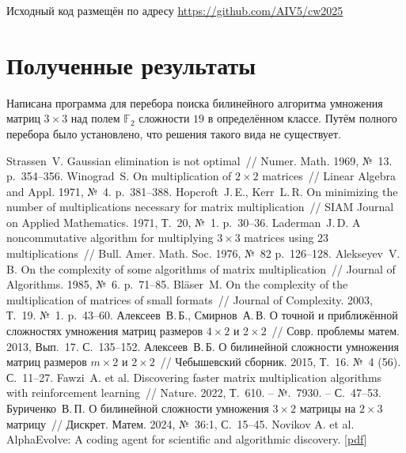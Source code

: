 \documentclass[12pt]{article}
\begin{document}
Исходный код размещён по адресу \url{https://github.com/AIV5/cw2025}

\section{Полученные результаты}

Написана программа для перебора поиска билинейного алгоритма умножения матриц $3 \times 3$ над полем $\mathbb F_2$ сложности $19$ в определённом классе. Путём полного перебора было установлено, что решения такого вида не существует.

%
\begin{thebibliography}{99}

   Strassen~V. Gaussian elimination is not optimal~// Numer. Math. 1969, №~13. p.~354--356.
   Winograd~S. On multiplication of $2 \times 2$ matrices~// Linear Algebra and Appl. 1971, №~4. p.~381--388.
   Hopcroft~J.\,E., Kerr~L.\,R. On minimizing the number of multiplications necessary for matrix multiplication~// SIAM Journal on Applied Mathematics. 1971, Т.~20, №~1. p.~30--36.
   Laderman~J.\,D. A noncommutative algorithm for multiplying $3 \times 3$ matrices using $23$ multiplications~// Bull. Amer. Math. Soc. 1976, №~82 p.~126--128.
   Alekseyev~V.\,B. On the complexity of some algorithms of matrix multiplication~// Journal of Algorithms. 1985, №~6. p.~71--85.
   Bläser~M. On the complexity of the multiplication of matrices of small formats~// Journal of Complexity. 2003, Т.~19. №~1. p.~43--60.
   Алексеев~В.\,Б., Смирнов~А.\,В. О точной и приближённой сложностях умножения матриц размеров $4 \times 2$ и $2 \times 2$~// Совр. проблемы матем. 2013, Вып.~17. С.~135--152.
   Алексеев~В.\,Б. О билинейной сложности умножения матриц размеров $m \times 2$ и $2 \times 2$~// Чебышевский сборник. 2015, Т.~16. №~4 (56). С.~11--27.
   Fawzi~A. et al. Discovering faster matrix multiplication algorithms with reinforcement learning~// Nature. 2022,  Т.~610. – №.~7930. – С.~47--53.
   Буриченко~В.\,П. О билинейной сложности умножения $3 \times 2$ матрицы на $ 2 \times 3$ матрицу~// Дискрет. Матем. 2024, №~36:1, С.~15--45.
   Novikov A. et al. AlphaEvolve: A coding agent for scientific and algorithmic discovery. [\href{https://storage.googleapis.com/deepmind-media/DeepMind.com/Blog/alphaevolve-a-gemini-powered-coding-agent-for-designing-advanced-algorithms/AlphaEvolve.pdf}{pdf}]
\end{thebibliography}
\end{document}
